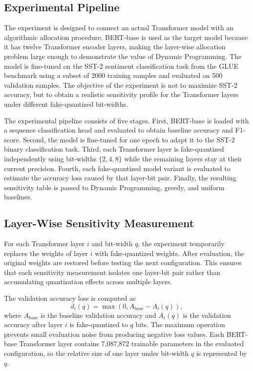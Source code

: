 \documentclass[conference]{IEEEtran}
\begin{document}
\subsection{Experimental Pipeline}
The experiment is designed to connect an actual Transformer model with an algorithmic allocation procedure. BERT-base is used as the target model because it has twelve Transformer encoder layers, making the layer-wise allocation problem large enough to demonstrate the value of Dynamic Programming. The model is fine-tuned on the SST-2 sentiment classification task from the GLUE benchmark using a subset of 2000 training samples and evaluated on 500 validation samples. The objective of the experiment is not to maximize SST-2 accuracy, but to obtain a realistic sensitivity profile for the Transformer layers under different fake-quantized bit-widths.

The experimental pipeline consists of five stages. First, BERT-base is loaded with a sequence classification head and evaluated to obtain baseline accuracy and F1-score. Second, the model is fine-tuned for one epoch to adapt it to the SST-2 binary classification task. Third, each Transformer layer is fake-quantized independently using bit-widths $\{2,4,8\}$ while the remaining layers stay at their current precision. Fourth, each fake-quantized model variant is evaluated to estimate the accuracy loss caused by that layer-bit pair. Finally, the resulting sensitivity table is passed to Dynamic Programming, greedy, and uniform baselines.

\subsection{Layer-Wise Sensitivity Measurement}
For each Transformer layer $i$ and bit-width $q$, the experiment temporarily replaces the weights of layer $i$ with fake-quantized weights. After evaluation, the original weights are restored before testing the next configuration. This ensures that each sensitivity measurement isolates one layer-bit pair rather than accumulating quantization effects across multiple layers.

The validation accuracy loss is computed as
\begin{equation}
d_i(q)=\max(0,A_{\mathrm{base}}-A_i(q)),
\end{equation}
where $A_{\mathrm{base}}$ is the baseline validation accuracy and $A_i(q)$ is the validation accuracy after layer $i$ is fake-quantized to $q$ bits. The maximum operation prevents small evaluation noise from producing negative loss values. Each BERT-base Transformer layer contains 7,087,872 trainable parameters in the evaluated configuration, so the relative size of one layer under bit-width $q$ is represented by $q$.
\end{document}
